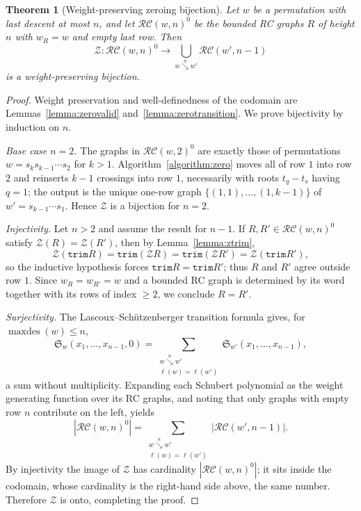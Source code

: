 \documentclass{amsart}
\newtheorem{theorem}{Theorem}[section]
\theoremstyle{definition}
\theoremstyle{remark}
\newcommand{\wof}[1]{w_{#1}}
\newcommand{\maxd}{\operatorname{maxdes}}
\newcommand{\sch}{\mathfrak{S}}
\newcommand{\downvar}[1]{\stackrel{#1}{\searrow}}
\newcommand{\trm}{\mathtt{trim}}
\newcommand{\zeromap}{\mathcal{Z}}
\begin{document}
\begin{theorem}[Weight-preserving zeroing bijection]\label{theorem:zero_bijection}
Let $w$ be a permutation with last descent at most $n$, and let $\mathcal{RC}(w,n)^0$ be the bounded RC graphs $R$ of height $n$ with $\wof{R}=w$ and empty last row. Then
\[
\zeromap:\mathcal{RC}(w,n)^0\to \bigcup_{w\downvar{n}w'}\mathcal{RC}(w',n-1)
\]
is a weight-preserving bijection.
\end{theorem}
\begin{proof}
Weight preservation and well-definedness of the codomain are Lemmas~\ref{lemma:zerovalid} and~\ref{lemma:zerotransition}. We prove bijectivity by induction on $n$.

\emph{Base case $n=2$.} The graphs in $\mathcal{RC}(w,2)^0$ are exactly those of permutations $w=s_k s_{k-1}\cdots s_2$ for $k>1$. Algorithm~\ref{algorithm:zero} moves all of row $1$ into row $2$ and reinserts $k-1$ crossings into row $1$, necessarily with roots $t_q-t_s$ having $q=1$; the output is the unique one-row graph $\{(1,1),\ldots,(1,k-1)\}$ of $w'=s_{k-1}\cdots s_1$. Hence $\zeromap$ is a bijection for $n=2$.

\emph{Injectivity.} Let $n>2$ and assume the result for $n-1$. If $R,R'\in\mathcal{RC}(w,n)^0$ satisfy $\zeromap(R)=\zeromap(R')$, then by Lemma~\ref{lemma:ztrim},
\[
\zeromap(\trm R)=\trm(\zeromap R)=\trm(\zeromap R')=\zeromap(\trm R'),
\]
so the inductive hypothesis forces $\trm R=\trm R'$; thus $R$ and $R'$ agree outside row $1$. Since $\wof{R}=\wof{R'}=w$ and a bounded RC graph is determined by its word together with its rows of index $\geq 2$, we conclude $R=R'$.

\emph{Surjectivity.} The Lascoux--Sch\"utzenberger transition formula gives, for $\maxd(w)\leq n$,
\[
\sch_w(x_1,\ldots,x_{n-1},0)=\sum_{\substack{w\downvar{n}w'\\\ell(w)=\ell(w')}}\sch_{w'}(x_1,\ldots,x_{n-1}),
\]
a sum without multiplicity. Expanding each Schubert polynomial as the weight generating function over its RC graphs, and noting that only graphs with empty row $n$ contribute on the left, yields
\[
|\mathcal{RC}(w,n)^0|=\sum_{\substack{w\downvar{n}w'\\\ell(w)=\ell(w')}}|\mathcal{RC}(w',n-1)|.
\]
By injectivity the image of $\zeromap$ has cardinality $|\mathcal{RC}(w,n)^0|$; it sits inside the codomain, whose cardinality is the right-hand side above, the same number. Therefore $\zeromap$ is onto, completing the proof.
\end{proof}
\end{document}
